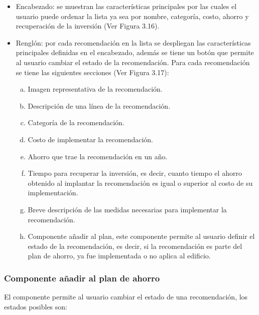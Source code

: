\begin{itemize}
\item Encabezado: se muestran las características principales por las cuales
  el usuario puede ordenar la lista ya sea por nombre, categoría, costo, ahorro
  y recuperación de la inversión (Ver Figura 3.16).
\item Renglón: por cada recomendación en la lista se despliegan las
  características principales definidas en el encabezado, además se tiene un botón
  que permite al usuario cambiar el estado de la recomendación.
  Para cada recomendación se tiene las siguientes secciones (Ver Figura 3.17):
  \begin{enumerate}[a)]
  \item Imagen representativa de la recomendación.
  \item Descripción de una línea de la recomendación.
  \item Categoría de la recomendación.
  \item Costo de implementar la recomendación.
  \item Ahorro que trae la recomendación en un año.
  \item Tiempo para recuperar la inversión, es decir, cuanto tiempo el ahorro
    obtenido al implantar la recomendación es igual o superior al costo
    de su implementación.
  \item Breve descripción de las medidas necesarias para implementar la
    recomendación.
  \item Componente añadir al plan, este componente permite al usuario definir el
    estado de la recomendación, es decir, si la recomendación es parte
    del plan de ahorro, ya fue implementada o no aplica al edificio.
  \end{enumerate}
\end{itemize}

\subsubsection{Componente añadir al plan de ahorro}

El componente  permite al usuario cambiar el estado
de una recomendación, los estados posibles son:


